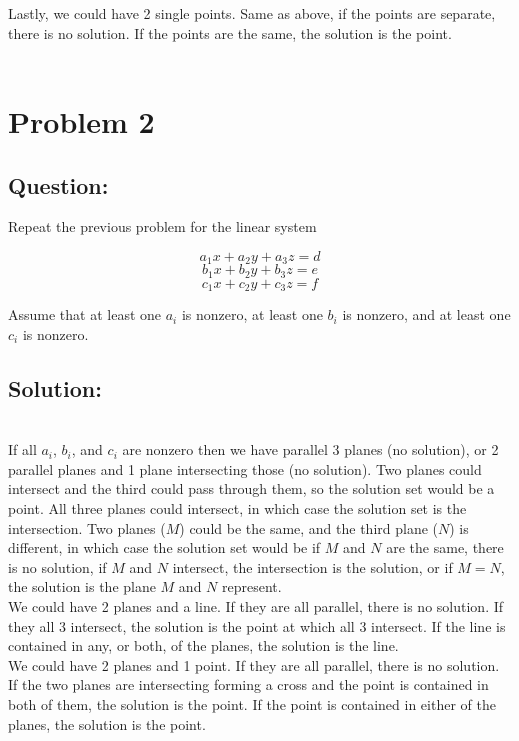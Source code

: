 \documentclass{article}
\begin{document}
Lastly, we could have 2 single points. Same as above, if the points are separate, there is no solution. If the points are the same, the solution is the point.
\\
\\
\section*{Problem 2}
\subsection*{Question:}
Repeat the previous problem for the linear system

$$a_{1}x + a_{2}y + a_{3}z = d$$
$$b_{1}x + b_{2}y + b_{3}z = e$$
$$c_{1}x + c_{2}y + c_{3}z = f$$

Assume that at least one $a_{i}$ is nonzero, at least one $b_{i}$ is nonzero, and at least one $c_{i}$ is nonzero.

\subsection*{Solution:}
\\
If all $a_{i}$, $b_{i}$, and $c_{i}$ are nonzero then we have parallel 3 planes (no solution), or 2 parallel planes and 1 plane intersecting those (no solution). Two planes could intersect and the third could pass through them, so the solution set would be a point.  All three planes could intersect, in which case the solution set is the intersection. Two planes ($M$) could be the same, and the third plane ($N$) is different, in which case the solution set would be if $M$ and $N$ are the same, there is no solution, if $M$ and $N$ intersect, the intersection is the solution, or if $M = N$, the solution is the plane $M$ and $N$ represent.
\\

We could have 2 planes and a line. If they are all parallel, there is no solution. If they all 3 intersect, the solution is the point at which all 3 intersect. If the line is contained in any, or both, of the planes, the solution is the line. 
\\

We could have 2 planes and 1 point. If they are all parallel, there is no solution. If the two planes are intersecting forming a cross and the point is contained in both of them, the solution is the point. If the point is contained in either of the planes, the solution is the point.
\\
\end{document}
